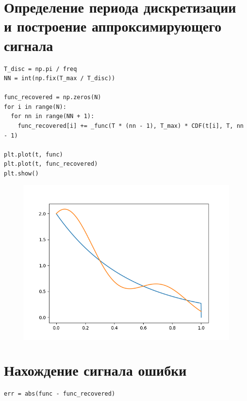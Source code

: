 \documentclass[12pt]{article}
\begin{document}
\section{ Определение периода дискретизации и построение аппроксимирующего сигнала}



\begin{lstlisting}
T_disc = np.pi / freq
NN = int(np.fix(T_max / T_disc))

func_recovered = np.zeros(N)
for i in range(N):
  for nn in range(NN + 1):
    func_recovered[i] += _func(T * (nn - 1), T_max) * CDF(t[i], T, nn - 1)

plt.plot(t, func)
plt.plot(t, func_recovered)
plt.show()
\end{lstlisting}

\begin{figure}[htp]
\centering
\includegraphics[scale=1.00]{compare.png}
\caption{}
\label{}
\end{figure}

\section{ Нахождение сигнала ошибки}

\begin{lstlisting}
err = abs(func - func_recovered)
\end{lstlisting}
\end{document}
